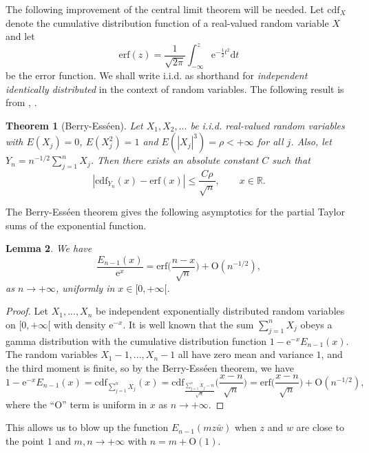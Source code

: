 \documentclass{birkart}
\newtheorem{thm}{Theorem}[section]
\newtheorem{lem}[thm]{Lemma}
\theoremstyle{definition}
\theoremstyle{remark}
\numberwithin{equation}{section}
\numberwithin{figure}{section}
\newcommand{\e}{\mathrm e}
\newcommand{\1}{{\mathbf 1}}
\newcommand{\R}{{\mathbb R}}
\newcommand{\Ordo}{\mathrm{O}}
\newcommand{\diff}{{\mathrm d}}
\begin{document}
The following improvement of the central 
limit theorem will be needed. Let 
$\mathrm{cdf}_X$ denote the cumulative distribution function 
of a real-valued random variable $X$ and let 
\[ 
\mathrm{erf}(z) = \frac{1}{\sqrt{2 \pi}} 
\int_{- \infty}^z \e^{-\frac12t^2} \diff t 
\]
be the error function. We shall write i.i.d. as shorthand for {\em 
independent identically distributed} in the context of random variables.
The following result is from \cite{berry}, \cite{esseen}.

\begin{thm}[Berry-Ess\'een]
Let $X_1, X_2, ...$ be i.i.d. real-valued random variables 
with $E(X_j)=0$, $E(X_j^2)=1$ and $E(|X_j|^3)=\rho<+\infty$
for all $j$. Also, let $Y_n = n^{-1/2}\sum_{j=1}^{n} X_j$.
Then there exists an absolute constant $C$ such that 
\[ 
\left| \mathrm{cdf}_{Y_n}(x) - \mathrm{erf}(x) \right| 
\leq \frac{C \rho}{\sqrt{n}}, \qquad x\in\R.
\]
\end{thm}
 
The Berry-Ess\'een theorem gives the following asymptotics for the partial
Taylor sums of the exponential function. 
 
\begin{lem} 
\label{erflemma}
We have
\[ 
\frac{E_{n-1}(x)}{\e^x} = \mathrm{erf}\bigg(\frac{n-x}{\sqrt{n}}\bigg) 
+ \Ordo(n^{-1/2}), 
\]
as $n\to+\infty$, uniformly in $x\in[0,+\infty[$.
\end{lem}


\begin{proof}
Let $X_1,...,X_n$ be independent exponentially distributed random variables 
on $[0,+\infty[$ with density $\e^{-x}$. It is well known that the 
sum $\sum_{j=1}^nX_j$ obeys a gamma distribution with the 
cumulative distribution function $1- \e^{-x}E_{n-1}(x)$. 
The random variables $X_1-1, ..., X_n-1$ all have zero mean and 
variance $1$, and the third moment is finite, so by the Berry-Ess\'een 
theorem, we have  
\begin{equation}
1-\e^{-x}E_{n-1}(x)=\text{cdf}_{\sum_{j=1}^n X_j}(x) 
=\mathrm{cdf}_{\frac{\sum_{j=1}^n X_j -n }{\sqrt{n}}}
\bigg(\frac{x-n}{\sqrt{n}}\bigg) 
=\mathrm{erf}\bigg(\frac{x-n}{\sqrt{n}}\bigg)+\Ordo(n^{-1/2}), 
\end{equation}
where the ``$\Ordo$'' term is uniform in $x$ as $n\to+\infty$. 
\end{proof}

This allows us to blow up the function $E_{n-1}(mz\bar w)$ when $z$ and $w$
are close to the point $1$ and $m,n\to+\infty$ with $n=m+\Ordo(1)$.
 
\end{document}
